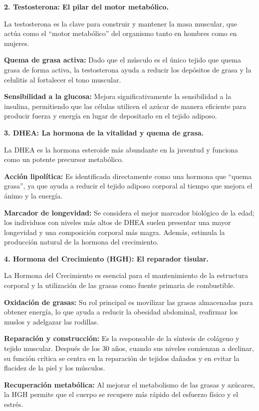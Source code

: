 \documentclass[
  spanish,
]{article}
\begin{document}
\textbf{2. Testosterona: El pilar del motor metabólico.}

La testosterona es la clave para construir y mantener la masa muscular, que actúa como el ``motor metabólico'' del organismo tanto en hombres como en mujeres.

\textbf{Quema de grasa activa:} Dado que el músculo es el único tejido que quema grasa de forma activa, la testosterona ayuda a reducir los depósitos de grasa y la celulitis al fortalecer el tono muscular.

\textbf{Sensibilidad a la glucosa:} Mejora significativamente la sensibilidad a la insulina, permitiendo que las células utilicen el azúcar de manera eficiente para producir fuerza y energía en lugar de depositarlo en el tejido adiposo.

\textbf{3. DHEA: La hormona de la vitalidad y quema de grasa.}

La DHEA es la hormona esteroide más abundante en la juventud y funciona como un potente precursor metabólico.

\textbf{Acción lipolítica:} Es identificada directamente como una hormona que ``quema grasa'', ya que ayuda a reducir el tejido adiposo corporal al tiempo que mejora el ánimo y la energía.

\textbf{Marcador de longevidad:} Se considera el mejor marcador biológico de la edad; los individuos con niveles más altos de DHEA suelen presentar una mayor longevidad y una composición corporal más magra. Además, estimula la producción natural de la hormona del crecimiento.

\textbf{4. Hormona del Crecimiento (HGH): El reparador tisular.}

La Hormona del Crecimiento es esencial para el mantenimiento de la estructura corporal y la utilización de las grasas como fuente primaria de combustible.

\textbf{Oxidación de grasas:} Su rol principal es movilizar las grasas almacenadas para obtener energía, lo que ayuda a reducir la obesidad abdominal, reafirmar los muslos y adelgazar las rodillas.

\textbf{Reparación y construcción:} Es la responsable de la síntesis de colágeno y tejido muscular. Después de los 30 años, cuando sus niveles comienzan a declinar, su función crítica se centra en la reparación de tejidos dañados y en evitar la flacidez de la piel y los músculos.

\textbf{Recuperación metabólica:} Al mejorar el metabolismo de las grasas y azúcares, la HGH permite que el cuerpo se recupere más rápido del esfuerzo físico y el estrés.
\end{document}
